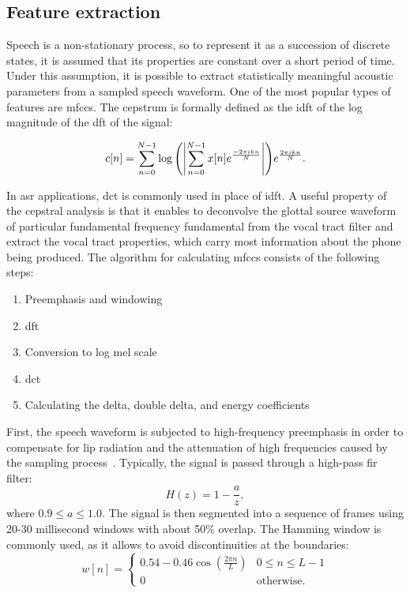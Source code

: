 \subsection{Feature extraction}
\label{subsection:features}
Speech is a non-stationary process, so to represent it as a succession of discrete states, it is assumed that its properties are constant over a short period of time. Under this assumption, it is possible to extract statistically meaningful acoustic parameters from a sampled speech waveform. One of the most popular types of features are \glspl{mfcc}. The cepstrum is formally defined as the \gls{idft} of the log magnitude of the \gls{dft} of the signal: 

\begin{equation}
	\label{equation:cepstrum}
	c[n]=\sum_{n=0}^{N-1}\log{\left(\left|\sum_{n=0}^{N-1}x[n]e^{\frac{-2\pi ikn}{N}}\right|\right)}e^{\frac{2\pi ikn}{N}}.
\end{equation}

In \gls{asr} applications, \gls{dct} is commonly used in place of \gls{idft}. A useful property of the cepstral analysis is that it enables to deconvolve the glottal source waveform of particular fundamental frequency \gls{fundamental} from the vocal tract filter and extract the vocal tract properties, which carry most information about the phone being produced. The algorithm for calculating \glspl{mfcc} consists of the following steps:
\begin{enumerate}
	\item Preemphasis and windowing
	\item \gls{dft}
	\item Conversion to log mel scale 
	\item \gls{dct}
	\item Calculating the delta, double delta, and energy coefficients
\end{enumerate}

First, the speech waveform is subjected to high-frequency preemphasis in order to compensate for lip radiation and the attenuation of high frequencies caused by the sampling process~\cite{singh2012preprocessing}. Typically, the signal is passed through a high-pass \gls{fir} filter:
\begin{equation}
H(z)=1-\frac{a}{z},
\end{equation}
where $0.9 \leq a \leq 1.0$. The signal is then segmented into a sequence of frames using 20-30 millisecond windows with about 50\% overlap. The Hamming window is commonly used, as it allows to avoid discontinuities at the boundaries:
\begin{equation}
\label{equation:hamming}
  w[n]=
  \begin{cases}
    0.54-0.46\cos(\frac{2 \pi n}{L}) & 0 \leq n \leq L-1 \\
    0                               & \text{otherwise.}
  \end{cases}
\end{equation}

